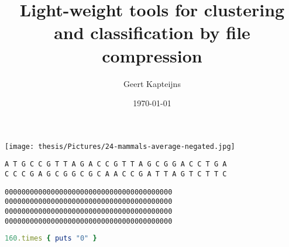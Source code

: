 \documentclass[]{beamer}
\title[]{
Light-weight tools for clustering and classification by file compression} %
\author{Geert Kapteijns} %
\institute[CWI] %
{
Universiteit van Amsterdam \\ %
\medskip
}
\date{\today} %
\begin{document}

\color{white}




\usetikzlibrary{arrows}



\begin{frame}
  \titlepage
\end{frame}

\begin{frame}
  \texttt{[image: thesis/Pictures/24-mammals-average-negated.jpg]}
\end{frame}

\begin{frame}
  \texttt{A	T	G	C	C	G	T	T	A	G	A	C	C	G	T	T	A	G	C	G	G	A	C	C	T	G	A}\\
  \texttt{C C C G A G C G G C G C A A C C G A T T A G T C T T C}
\end{frame}

\begin{frame}
  \texttt{0000000000000000000000000000000000000000\\
          0000000000000000000000000000000000000000\\
          0000000000000000000000000000000000000000\\
          0000000000000000000000000000000000000000}
\end{frame}

\begin{frame}[fragile]
    \begin{lstlisting}[language=Ruby]
      160.times { puts "0" }
    \end{lstlisting}
\end{frame}
\end{document}
